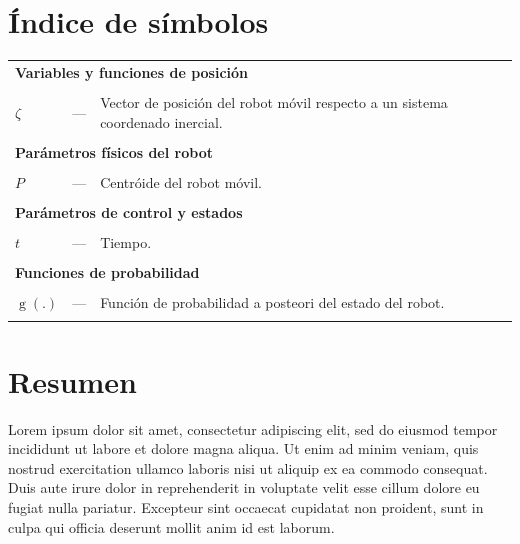\documentclass[11pt]{report} %
\DeclareMathOperator{\g}{g}
\begin{document}

\tableofcontents

\cleardoublepage
\listoffigures

\cleardoublepage
\renewcommand{\listtablename}{Índice de tablas}
\listoftables

\cleardoublepage
\chapter*{Índice de símbolos}
\begin{longtable}{p{5mm} c p{120mm} }

\multicolumn{3}{l}{\textbf{Variables y funciones de posición}}\\
\\
$\zeta$ & --- & Vector de posición del robot móvil respecto a un sistema coordenado inercial.\\
\\
\multicolumn{3}{l}{\textbf{Parámetros físicos del robot}}\\
\\
$P$ & --- & Centróide del robot móvil.\\

\\
\multicolumn{3}{l}{\textbf{Parámetros de control y estados}}\\
\\
$t$ & --- & Tiempo.\\

\\
\multicolumn{3}{l}{\textbf{Funciones de probabilidad}}\\
\\
$\g(.)$ & --- & Función de probabilidad a posteori del estado del robot.\\

\\


\end{longtable}

\chapter*{Resumen}

Lorem ipsum dolor sit amet, consectetur adipiscing elit, sed do eiusmod tempor incididunt ut labore et dolore magna aliqua. Ut enim ad minim veniam, quis nostrud exercitation ullamco laboris nisi ut aliquip ex ea commodo consequat. Duis aute irure dolor in reprehenderit in voluptate velit esse cillum dolore eu fugiat nulla pariatur. Excepteur sint occaecat cupidatat non proident, sunt in culpa qui officia deserunt mollit anim id est laborum.
\end{document}
